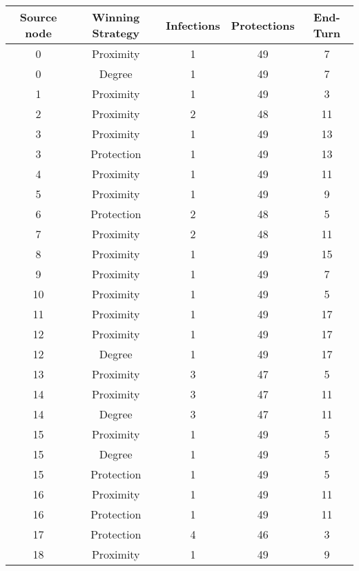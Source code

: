\documentclass[results.tex]{subfiles}
\begin{document}
\begin{center}
  \begin{tabular}{| c || c | c | c | c |}
    \hline
    {\bfseries Source node} & {\bfseries Winning Strategy} & {\bfseries Infections} & {\bfseries Protections} & {\bfseries End-Turn} \\  %
    \hline\hline
    0 & Proximity & 1 & 49 & 7 \\ 
    \hline
    0 & Degree & 1 & 49 & 7 \\ 
    \hline
    1 & Proximity & 1 & 49 & 3 \\ 
    \hline
    2 & Proximity & 2 & 48 & 11 \\ 
    \hline
    3 & Proximity & 1 & 49 & 13 \\ 
    \hline
    3 & Protection & 1 & 49 & 13 \\ 
    \hline
    4 & Proximity & 1 & 49 & 11 \\ 
    \hline
    5 & Proximity & 1 & 49 & 9 \\ 
    \hline
    6 & Protection & 2 & 48 & 5 \\ 
    \hline
    7 & Proximity & 2 & 48 & 11 \\ 
    \hline
    8 & Proximity & 1 & 49 & 15 \\ 
    \hline
    9 & Proximity & 1 & 49 & 7 \\ 
    \hline
    10 & Proximity & 1 & 49 & 5 \\ 
    \hline
    11 & Proximity & 1 & 49 & 17 \\ 
    \hline
    12 & Proximity & 1 & 49 & 17 \\ 
    \hline
    12 & Degree & 1 & 49 & 17 \\ 
    \hline
    13 & Proximity & 3 & 47 & 5 \\ 
    \hline
    14 & Proximity & 3 & 47 & 11 \\ 
    \hline
    14 & Degree & 3 & 47 & 11 \\ 
    \hline
    15 & Proximity & 1 & 49 & 5 \\ 
    \hline
    15 & Degree & 1 & 49 & 5 \\ 
    \hline
    15 & Protection & 1 & 49 & 5 \\ 
    \hline
    16 & Proximity & 1 & 49 & 11 \\ 
    \hline
    16 & Protection & 1 & 49 & 11 \\ 
    \hline
    17 & Protection & 4 & 46 & 3 \\ 
    \hline
    18 & Proximity & 1 & 49 & 9 \\ 
    \hline

\end{tabular}
\end{center}
\end{document}
